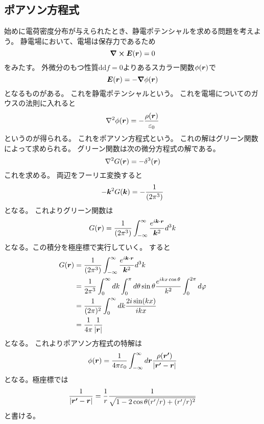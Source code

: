 \documentclass[../../master.tex]{subfiles}
\begin{document}
\subsection{ポアソン方程式}
始めに電荷密度分布が与えられたとき、静電ポテンシャルを求める問題を考えよう。
静電場において、電場は保存力であるため
\begin{equation}
	\curl \vb*{E}(\vb*{r}) = 0
\end{equation}
をみたす。
外微分のもつ性質\(\text{dd}f=0\)よりあるスカラー関数\(\phi(\vb*{r})\)で
\begin{equation}
	\vb*{E}(\vb*{r})= -\grad \phi(\vb*{r})
\end{equation}
となるものがある。
これを静電ポテンシャルという。
これを電場についてのガウスの法則に入れると
\begin{equation}
	\laplacian \phi(\vb*{r}) = -\frac{\rho(\vb*{r})}{\varepsilon_0}
\end{equation}
というのが得られる。
これをポアソン方程式という。
これの解はグリーン関数によって求められる。
グリーン関数は次の微分方程式の解である。
\begin{equation}
	\laplacian G(\vb*{r}) = -\delta^3(\vb*{r})
\end{equation}
これを求める。
両辺をフーリエ変換すると
\begin{equation}
	-\vb*{k}^2G(\vb*{k}) = -\frac{1}{(2\pi^3)}
\end{equation}
となる。
これよりグリーン関数は
\begin{equation}
	G(\vb*{r})=\frac{1}{(2\pi^3)}\int_{-\infty}^{\infty} \frac{e^{i\vb*{k}\cdot\vb*{r}}}{\vb*{k}^2}d^3k
\end{equation}
となる。この積分を極座標で実行していく。
すると
\begin{align*}
	G(\vb*{r}) & =\frac{1}{(2\pi^3)}\int_{-\infty}^{\infty} \frac{e^{i\vb*{k}\cdot\vb*{r}}}{\vb*{k}^2}d^3k                                  \\
	           & =\frac{1}{2\pi^3}\int_{0}^{\infty}dk \int_{0}^{\pi}d\theta \sin\theta \frac{e^{ikx\cos\theta}}{k^2}\int_{0}^{2\pi}d\varphi \\
	           & =\frac{1}{(2\pi)^2}\int_{0}^{\infty}dk \frac{2i\sin(kx)}{ikx}                                                              \\
	           & =\frac{1}{4\pi}\frac{1}{\abs{\vb*{r}}}
\end{align*}
となる。
これよりポアソン方程式の特解は
\begin{equation}
	\phi(\vb*{r}) = \frac{1}{4\pi\varepsilon_0}\int_{-\infty}^{\infty} d\vb*{r}
	\frac{\rho(\vb*{r'})}{\abs{\vb*{r'}-\vb*{r}}}
\end{equation}
となる。極座標では
\begin{equation}
	\frac{1}{\abs{\vb*{r'}-\vb*{r}}} = \frac{1}{r}\frac{1}{\sqrt{1-2\cos\theta(r'/r) + (r'/r)^2}}
\end{equation}
と書ける。
\end{document}
